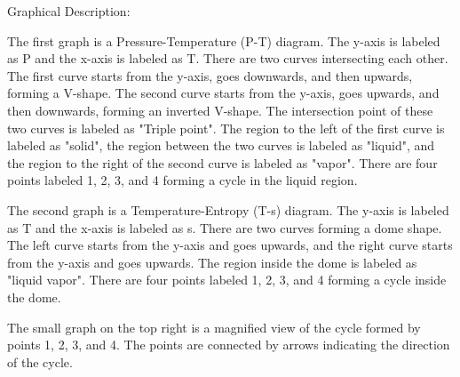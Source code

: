 Graphical Description:

The first graph is a Pressure-Temperature (P-T) diagram. The y-axis is labeled as P and the x-axis is labeled as T. There are two curves intersecting each other. The first curve starts from the y-axis, goes downwards, and then upwards, forming a V-shape. The second curve starts from the y-axis, goes upwards, and then downwards, forming an inverted V-shape. The intersection point of these two curves is labeled as "Triple point". The region to the left of the first curve is labeled as "solid", the region between the two curves is labeled as "liquid", and the region to the right of the second curve is labeled as "vapor". There are four points labeled 1, 2, 3, and 4 forming a cycle in the liquid region.

The second graph is a Temperature-Entropy (T-s) diagram. The y-axis is labeled as T and the x-axis is labeled as s. There are two curves forming a dome shape. The left curve starts from the y-axis and goes upwards, and the right curve starts from the y-axis and goes upwards. The region inside the dome is labeled as "liquid vapor". There are four points labeled 1, 2, 3, and 4 forming a cycle inside the dome.

The small graph on the top right is a magnified view of the cycle formed by points 1, 2, 3, and 4. The points are connected by arrows indicating the direction of the cycle.